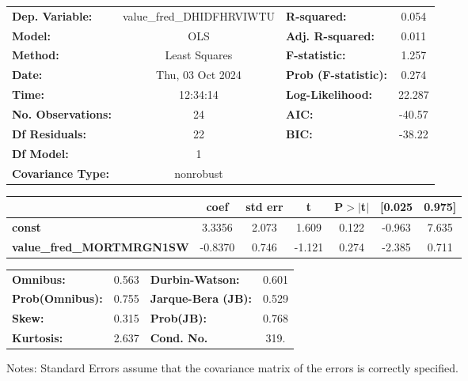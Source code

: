 \begin{center}
\begin{tabular}{lclc}
\toprule
\textbf{Dep. Variable:}           & value\_fred\_DHIDFHRVIWTU & \textbf{  R-squared:         } &     0.054   \\
\textbf{Model:}                   &            OLS            & \textbf{  Adj. R-squared:    } &     0.011   \\
\textbf{Method:}                  &       Least Squares       & \textbf{  F-statistic:       } &     1.257   \\
\textbf{Date:}                    &      Thu, 03 Oct 2024     & \textbf{  Prob (F-statistic):} &    0.274    \\
\textbf{Time:}                    &          12:34:14         & \textbf{  Log-Likelihood:    } &    22.287   \\
\textbf{No. Observations:}        &               24          & \textbf{  AIC:               } &    -40.57   \\
\textbf{Df Residuals:}            &               22          & \textbf{  BIC:               } &    -38.22   \\
\textbf{Df Model:}                &                1          & \textbf{                     } &             \\
\textbf{Covariance Type:}         &         nonrobust         & \textbf{                     } &             \\
\bottomrule
\end{tabular}
\begin{tabular}{lcccccc}
                                  & \textbf{coef} & \textbf{std err} & \textbf{t} & \textbf{P$> |$t$|$} & \textbf{[0.025} & \textbf{0.975]}  \\
\midrule
\textbf{const}                    &       3.3356  &        2.073     &     1.609  &         0.122        &       -0.963    &        7.635     \\
\textbf{value\_fred\_MORTMRGN1SW} &      -0.8370  &        0.746     &    -1.121  &         0.274        &       -2.385    &        0.711     \\
\bottomrule
\end{tabular}
\begin{tabular}{lclc}
\textbf{Omnibus:}       &  0.563 & \textbf{  Durbin-Watson:     } &    0.601  \\
\textbf{Prob(Omnibus):} &  0.755 & \textbf{  Jarque-Bera (JB):  } &    0.529  \\
\textbf{Skew:}          &  0.315 & \textbf{  Prob(JB):          } &    0.768  \\
\textbf{Kurtosis:}      &  2.637 & \textbf{  Cond. No.          } &     319.  \\
\bottomrule
\end{tabular}
\end{center}

Notes: \newline
 [1] Standard Errors assume that the covariance matrix of the errors is correctly specified.